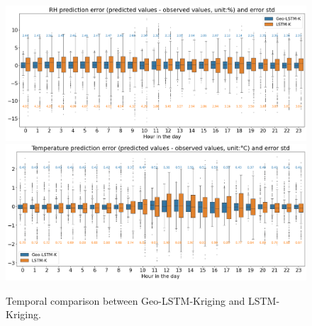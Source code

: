 \documentclass[a4paper,fleqn]{cas-sc}
\begin{document}
\begin{figure}[!h]
	\centering
	\includegraphics[scale=0.29]{figs/new_figs/RHerrstd.png}
    \includegraphics[scale=0.29]{figs/new_figs/temerrstd.png}
	\caption{Temporal comparison between Geo-LSTM-Kriging and LSTM-Kriging.}
	\label{FIG:baselines3}
\end{figure}



\end{document}
